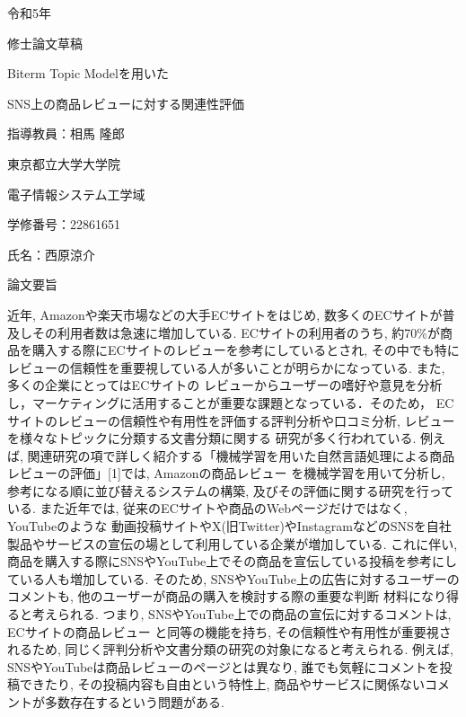 \documentclass{ltjarticle}
\begin{document}
\begin{titlepage}
    \begin{center}
        {\Large 令和5年}
        \vspace{10truept}

        {\Large 修士論文草稿}
        \vspace*{180truept}

        {\Huge Biterm Topic Modelを用いた}\par
        {\Huge SNS上の商品レビューに対する関連性評価}
        \vspace{160truept}

        {\Large 指導教員：相馬 隆郎}
        \vspace{30truept}

        {\Large 東京都立大学大学院}
        \vspace{10truept}

        {\Large 電子情報システム工学域}
        \vspace{30truept}

        {\Large 学修番号：22861651}
        \vspace{10truept}
        
        {\Large 氏名：西原涼介}
    \end{center}
\end{titlepage}
\noindent
{\LARGE 論文要旨}
\vspace{20truept}

近年, Amazonや楽天市場などの大手ECサイトをはじめ, 数多くのECサイトが普及しその利用者数は急速に増加している. 
ECサイトの利用者のうち, 約70\%が商品を購入する際にECサイトのレビューを参考にしているとされ, 
その中でも特にレビューの信頼性を重要視している人が多いことが明らかになっている. また, 多くの企業にとってはECサイトの
レビューからユーザーの嗜好や意見を分析し，マーケティングに活用することが重要な課題となっている．そのため，
ECサイトのレビューの信頼性や有用性を評価する評判分析や口コミ分析, レビューを様々なトピックに分類する文書分類に関する
研究が多く行われている. 例えば, 関連研究の項で詳しく紹介する「機械学習を用いた自然言語処理による商品レビューの評価」[1]では, Amazonの商品レビュー
を機械学習を用いて分析し, 参考になる順に並び替えるシステムの構築, 及びその評価に関する研究を行っている. 
また近年では, 従来のECサイトや商品のWebページだけではなく, YouTubeのような
動画投稿サイトやX(旧Twitter)やInstagramなどのSNSを自社製品やサービスの宣伝の場として利用している企業が増加している. 
これに伴い, 商品を購入する際にSNSやYouTube上でその商品を宣伝している投稿を参考にしている人も増加している. 
そのため, SNSやYouTube上の広告に対するユーザーのコメントも, 他のユーザーが商品の購入を検討する際の重要な判断
材料になり得ると考えられる. つまり, SNSやYouTube上での商品の宣伝に対するコメントは, ECサイトの商品レビュー
と同等の機能を持ち, その信頼性や有用性が重要視されるため, 同じく評判分析や文書分類の研究の対象になると考えられる. 
例えば, SNSやYouTubeは商品レビューのページとは異なり, 誰でも気軽にコメントを投稿できたり, その投稿内容も自由という特性上, 
商品やサービスに関係ないコメントが多数存在するという問題がある.
\end{document}
